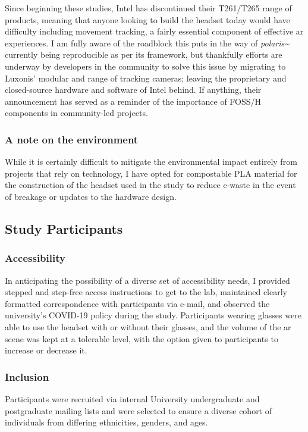 Since beginning these studies, Intel has discontinued their T261/T265 range of products, meaning that anyone looking to build the headset today would have difficulty including movement tracking, a fairly essential component of effective \gls{ar} experiences. I am fully aware of the roadblock this puts in the way of \textit{polaris\textasciitilde{}} currently being reproducible as per its framework, but thankfully efforts are underway by developers in the community to solve this issue by migrating to Luxonis' modular and  range of tracking cameras; leaving the proprietary and closed-source hardware and software of Intel behind. If anything, their announcement has served as a reminder of the importance of FOSS/H components in community-led projects.

\subsubsection{A note on the environment}\label{sec: polaris-ethics-environment}
While it is certainly difficult to mitigate the environmental impact entirely from projects that rely on technology, I have opted for compostable PLA material for the construction of the headset used in the study to reduce e-waste in the event of breakage or updates to the hardware design.

\subsection{Study Participants}\label{sec: polaris-ethics-participants}
\subsubsection{Accessibility}\label{sec: polaris-ethics-accessibility}
In anticipating the possibility of a diverse set of accessibility needs, I provided stepped and step-free access instructions to get to the lab, maintained clearly formatted correspondence with participants via e-mail, and observed the university's COVID-19 policy during the study. Participants wearing glasses were able to use the headset with or without their glasses, and the volume of the \gls{ar} scene was kept at a tolerable level, with the option given to participants to increase or decrease it.

\subsubsection{Inclusion}\label{sec: polaris-ethics-inclusion}
Participants were recruited via internal University undergraduate and postgraduate mailing lists and were selected to ensure a diverse cohort of individuals from differing ethnicities, genders, and ages.

